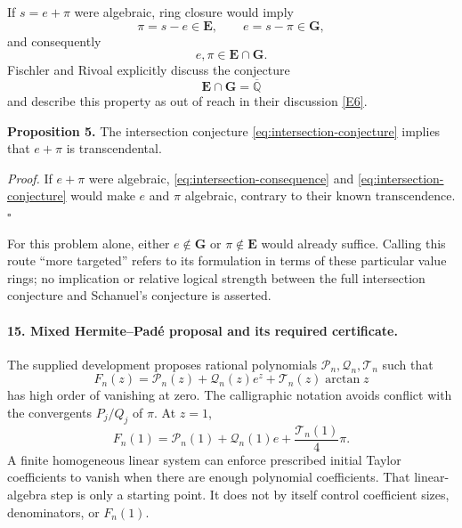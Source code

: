 \documentclass[11pt]{article}
\newcommand{\Qbar}{\overline{\mathbb Q}}
\begin{document}
If $s=e+\pi$ were algebraic, ring closure would imply
\[
 \pi=s-e\in\mathbf E,\qquad e=s-\pi\in\mathbf G,
\]
and consequently
\begin{equation}\label{eq:intersection-consequence}
 e,\pi\in\mathbf E\cap\mathbf G.
\end{equation}
Fischler and Rivoal explicitly discuss the conjecture
\begin{equation}\label{eq:intersection-conjecture}
 \boxed{\mathbf E\cap\mathbf G=\Qbar}
\end{equation}
and describe this property as out of reach in their discussion
\href{https://arxiv.org/html/2301.13518v1}{[E6]}.

\textbf{Proposition 5.} The intersection conjecture
\eqref{eq:intersection-conjecture} implies that $e+\pi$ is transcendental.

\emph{Proof.} If $e+\pi$ were algebraic, \eqref{eq:intersection-consequence}
and \eqref{eq:intersection-conjecture} would make $e$ and $\pi$ algebraic,
contrary to their known transcendence.\hfill$\square$

For this problem alone, either $e\notin\mathbf G$ or
$\pi\notin\mathbf E$ would already suffice. Calling this route
``more targeted'' refers to its formulation in terms of these particular
value rings; no implication or relative logical strength between the
full intersection conjecture and Schanuel's conjecture is asserted.

\paragraph{15. Mixed Hermite--Pad\'e proposal and its required certificate.}
The supplied development proposes rational polynomials
$\mathcal P_n,\mathcal Q_n,\mathcal T_n$ such that
\begin{equation}\label{eq:pade-function}
 F_n(z)=\mathcal P_n(z)+\mathcal Q_n(z)e^z+
          \mathcal T_n(z)\arctan z
\end{equation}
has high order of vanishing at zero. The calligraphic notation avoids
conflict with the convergents $P_j/Q_j$ of $\pi$. At $z=1$,
\begin{equation}\label{eq:pade-value}
 F_n(1)=\mathcal P_n(1)+\mathcal Q_n(1)e+
          \frac{\mathcal T_n(1)}4\pi.
\end{equation}
A finite homogeneous linear system can enforce prescribed initial Taylor
coefficients to vanish when there are enough polynomial coefficients.
That linear-algebra step is only a starting point. It does not by itself
control coefficient sizes, denominators, or $F_n(1)$.
\end{document}
